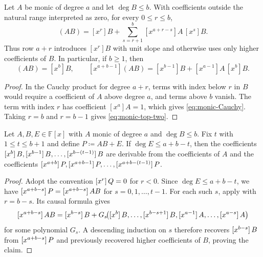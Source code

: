 \begin{lemma}
\label{lem:monic-cauchy-transport}
Let $A$ be monic of degree $a$ and let $\deg B\le b$.  With coefficients
outside the natural range interpreted as zero, for every $0\le r\le b$,
\begin{equation}
  [x^{a+r}](AB)=[x^r]B+
    \sum_{s=r+1}^{b}[x^{a+r-s}]A\,[x^s]B.
  \tag{monic-Cauchy}\label{eq:monic-Cauchy}
\end{equation}
Thus row $a+r$ introduces $[x^r]B$ with unit slope and otherwise uses only
higher coefficients of $B$.  In particular, if $b\ge1$, then
\begin{equation}
  [x^{a+b}](AB)=[x^b]B,
  \qquad
  [x^{a+b-1}](AB)=[x^{b-1}]B+[x^{a-1}]A\,[x^b]B.
  \tag{monic-top-two}\label{eq:monic-top-two}
\end{equation}
\end{lemma}
\begin{proof}
In the Cauchy product for degree $a+r$, terms with index below $r$ in $B$
would require a coefficient of $A$ above degree $a$, and terms above $b$
vanish.  The term with index $r$ has coefficient $[x^a]A=1$, which gives
\eqref{eq:monic-Cauchy}.  Taking $r=b$ and $r=b-1$ gives
\eqref{eq:monic-top-two}.
\end{proof}

\begin{lemma}\label{lem:peel-monic-factor}
    Let $A,B,E\in\mathbb{F}[x]$ with $A$ monic of degree $a$ and $\deg B\le b$.
    Fix $t$ with $1\le t\le b+1$ and define $P\coloneqq AB+E$.
    If $\deg E\le a+b-t$, then the coefficients $\coeff{B}{b},\coeff{B}{b-1},\ldots,\coeff{B}{b-(t-1)}$ are derivable from the coefficients of $A$ and the coefficients $\coeff{P}{a+b},\coeff{P}{a+b-1},\ldots,\coeff{P}{a+b-(t-1)}$.
\end{lemma}
\begin{proof}
    Adopt the convention $\coeff{Q}{r}=0$ for $r<0$.
    Since $\deg E\le a+b-t$, we have $\coeff{P}{a+b-s}=\coeff{AB}{a+b-s}$ for $s=0,1,\ldots,t-1$.
    For each such $s$, apply  with
    $r=b-s$.  Its causal formula gives
    \[
        \coeff{AB}{a+b-s}=\coeff{B}{b-s}+G_s\!\bigl(\coeff{B}{b},\ldots,\coeff{B}{b-s+1},\coeff{A}{a-1},\ldots,\coeff{A}{a-s}\bigr)
    \]
    for some polynomial $G_s$.
    A descending induction on $s$ therefore recovers $\coeff{B}{b-s}$ from $\coeff{P}{a+b-s}$ and previously recovered higher coefficients of $B$, proving the claim.
\end{proof}

